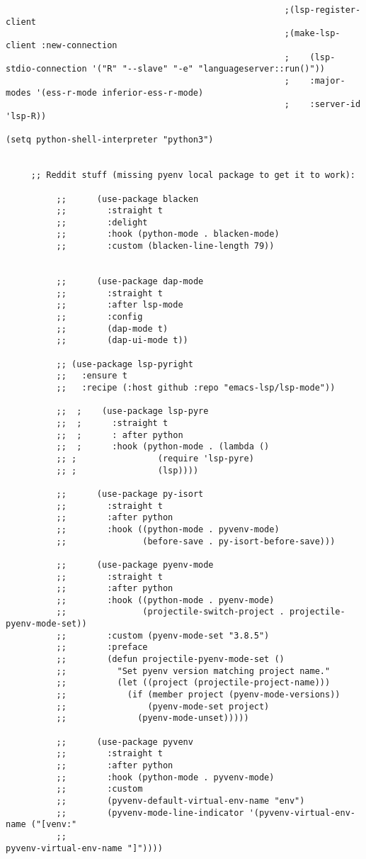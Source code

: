 \documentclass[11pt]{article}
\begin{document}
\begin{verbatim}
                                                       ;(lsp-register-client
                                                       ;(make-lsp-client :new-connection
                                                       ;    (lsp-stdio-connection '("R" "--slave" "-e" "languageserver::run()"))
                                                       ;    :major-modes '(ess-r-mode inferior-ess-r-mode)
                                                       ;    :server-id 'lsp-R))

(setq python-shell-interpreter "python3")


     ;; Reddit stuff (missing pyenv local package to get it to work):

          ;;      (use-package blacken
          ;;        :straight t
          ;;        :delight
          ;;        :hook (python-mode . blacken-mode)
          ;;        :custom (blacken-line-length 79))


          ;;      (use-package dap-mode
          ;;        :straight t 
          ;;        :after lsp-mode
          ;;        :config
          ;;        (dap-mode t)
          ;;        (dap-ui-mode t))

          ;; (use-package lsp-pyright
          ;;   :ensure t
          ;;   :recipe (:host github :repo "emacs-lsp/lsp-mode"))

          ;;  ;    (use-package lsp-pyre
          ;;  ;      :straight t
          ;;  ;      : after python
          ;;  ;      :hook (python-mode . (lambda ()
          ;; ;			      (require 'lsp-pyre)
          ;; ;			      (lsp))))

          ;;      (use-package py-isort
          ;;        :straight t
          ;;        :after python
          ;;        :hook ((python-mode . pyvenv-mode)
          ;;               (before-save . py-isort-before-save)))

          ;;      (use-package pyenv-mode
          ;;        :straight t
          ;;        :after python
          ;;        :hook ((python-mode . pyenv-mode)
          ;;               (projectile-switch-project . projectile-pyenv-mode-set))
          ;;        :custom (pyenv-mode-set "3.8.5")
          ;;        :preface
          ;;        (defun projectile-pyenv-mode-set ()
          ;;          "Set pyenv version matching project name."
          ;;          (let ((project (projectile-project-name)))
          ;;            (if (member project (pyenv-mode-versions))
          ;;                (pyenv-mode-set project)
          ;;              (pyenv-mode-unset)))))

          ;;      (use-package pyvenv
          ;;        :straight t
          ;;        :after python
          ;;        :hook (python-mode . pyvenv-mode)
          ;;        :custom
          ;;        (pyvenv-default-virtual-env-name "env")
          ;;        (pyvenv-mode-line-indicator '(pyvenv-virtual-env-name ("[venv:"
          ;;                                                               pyvenv-virtual-env-name "]"))))

\end{verbatim}
\end{document}
